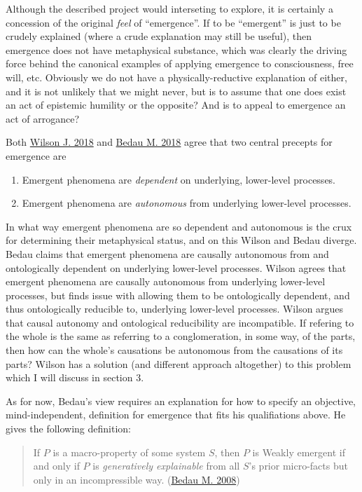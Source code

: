 \documentclass{article}
\newcommand{\ti}[1]{\textit{#1}}
\renewcommand{\cite}[1]{\hyperlink{#1}{#1}}
\begin{document}
Although the described project would interseting to explore, it is certainly a concession of the original \ti{feel} of ``emergence''. If to be ``emergent'' is just to be crudely explained (where a crude explanation may still be useful), then emergence does not have metaphysical substance, which was clearly the driving force behind the canonical examples of applying emergence to consciousness, free will, etc. Obviously we do not have a physically-reductive explanation of either, and it is not unlikely that we might never, but is to assume that one does exist an act of epistemic humility or the opposite? And is to appeal to emergence an act of arrogance?

Both \cite{Wilson J. 2018} and \cite{Bedau M. 2018} agree that two central precepts for emergence are

\begin{enumerate}
\item Emergent phenomena are \ti{dependent} on underlying, lower-level processes.
\item Emergent phenomena are \ti{autonomous} from underlying lower-level processes.
\end{enumerate}

In what way emergent phenomena are so dependent and autonomous is the crux for determining their metaphysical status, and on this Wilson and Bedau diverge. Bedau claims that emergent phenomena are causally autonomous from and ontologically dependent on underlying lower-level processes. Wilson agrees that emergent phenomena are causally autonomous from underlying lower-level processes, but finds issue with allowing them to be ontologically dependent, and thus ontologically reducible to, underlying lower-level processes. Wilson argues that causal autonomy and ontological reducibility are incompatible. If refering to the whole is the same as referring to a conglomeration, in some way, of the parts, then how can the whole's causations be autonomous from the causations of its parts? Wilson has a solution (and different approach altogether) to this problem which I will discuss in section 3.

As for now, Bedau's view requires an explanation for how to specify an objective, mind-independent, definition for emergence that fits his qualifiations above. He gives the following definition:

\begin{quote}
If $P$ is a macro-property of some system $S$, then $P$ is Weakly emergent if and only if $P$ is \ti{generatively explainable} from all $S$'s prior micro-facts but only in an incompressible way.
(\cite{Bedau M. 2008})
\end{quote}
\end{document}
